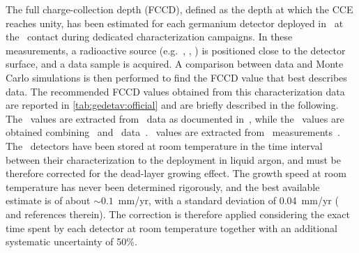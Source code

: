 The full charge-collection depth (FCCD), defined as the depth at which the CCE reaches
unity, has been estimated for each germanium detector deployed in \gerda\ at the \nplus\
contact during dedicated characterization campaigns. In these measurements, a radioactive
source (e.g.~\Am, \Ba, \Co) is positioned close to the detector surface, and a data sample
is acquired. A comparison between data and Monte Carlo simulations is then performed to
find the FCCD value that best describes data. The recommended FCCD values obtained from
this characterization data are reported in \cref{tab:gedetav:official} and are briefly
described in the following. The \scoax\ values are extracted from \Co\ data as documented
in~\cite{Heider2009}, while the \bege\ values are obtained combining \Am\ and \Ba\
data~\cite{Agostini2019}. \icoax\ values are extracted from \Am\
measurements~\cite{Miloradovic2020}. The \bege\ detectors have been stored at room
temperature in the time interval between their characterization to the deployment in
liquid argon, and must be therefore corrected for the dead-layer growing effect. The
growth speed at room temperature has never been determined rigorously, and the best
available estimate is of about $\sim$$0.1$~mm/yr, with a standard deviation of 0.04~mm/yr
(\cite{Agostini2019} and references therein). The correction is therefore applied
considering the exact time spent by each detector at room temperature together with an
additional systematic uncertainty of 50\%.
\begin{table}
  \centering
  \caption{%
    Recommended full charge-collection depth (FCCD) and dead layer fraction (DLF) values
    for each detector deployed in \gerdatwo, calculated from detector characterization
    data. The \bege\ FCCD values are obtained combining \Am\ and \Ba\
    data~\cite{Agostini2019} while \scoax\ values are extracted from \Co\
    data~\cite{Heider2009}. The \icoax\ values are obtained from \Am\
    data~\cite{Miloradovic2020}. The \bege\ FCCDs are corrected for the dead-layer growing
    effect at room temperature experienced before deployment in
    \gerda~\cite{Agostini2019}. The \bege\ uncertainties are split into correlated and
    uncorrelated contributions (FCCD$\protect\substack{+\text{corr}\,+\text{ucorr} \\
    -\text{corr}\,-\text{ucorr}}$). The DLF values have been estimated
    in~\cite{Lehnert2016} and do not include any growing effect at room temperature.
    Detector \GD{02D} does not fully deplete and is therefore excluded from any physics
    analysis~\cite{Agostini2019}.
  }\label{tab:gedetav:official}
  
\end{table}


